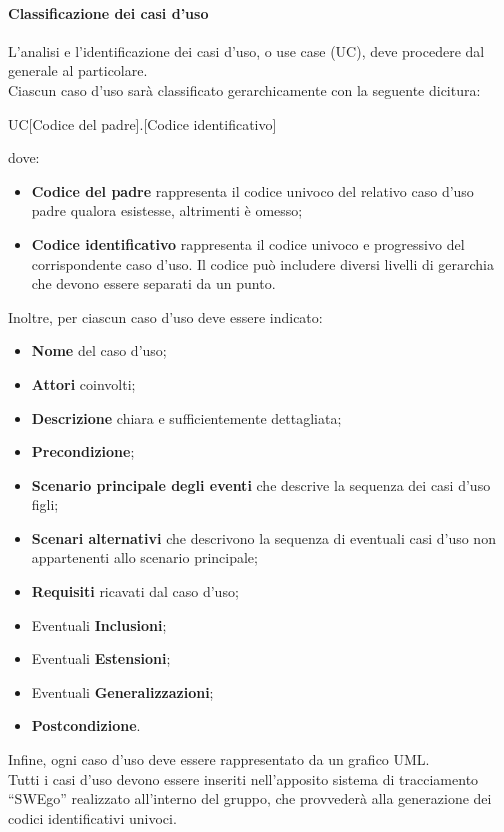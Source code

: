 \documentclass[../NormeDiProgetto.tex]{subfiles}
\begin{document}
			\paragraph{Classificazione dei casi d'uso\\}
				L'analisi e l'identificazione dei casi d'uso, o use case (UC), deve
				procedere dal generale al particolare.\\
				Ciascun caso d'uso sarà classificato gerarchicamente con la seguente dicitura:
				\begin{center}
					UC[Codice del padre].[Codice identificativo]
				\end{center}
				dove:
				\begin{itemize}
					\item \textbf{Codice del padre} rappresenta il codice univoco
					del relativo caso d'uso padre qualora esistesse, altrimenti è omesso;
					\item \textbf{Codice identificativo} rappresenta il codice
					univoco e progressivo del corrispondente caso d'uso. Il codice
					può includere diversi livelli di gerarchia che devono essere
					separati da un punto.
				\end{itemize}
				Inoltre, per ciascun caso d'uso deve essere indicato:
				\begin{itemize}
					\item \textbf{Nome} del caso d'uso;
					\item \textbf{Attori} coinvolti;
					\item \textbf{Descrizione} chiara e sufficientemente
					dettagliata;
					\item \textbf{Precondizione};
					\item \textbf{Scenario principale degli eventi} che descrive
					la sequenza dei casi d'uso figli;
					\item \textbf{Scenari alternativi} che descrivono la sequenza
					di eventuali casi d'uso non appartenenti allo scenario
					principale;
					\item \textbf{Requisiti} ricavati dal caso d'uso;
					\item Eventuali \textbf{Inclusioni};
					\item Eventuali \textbf{Estensioni};
					\item Eventuali \textbf{Generalizzazioni};
					\item \textbf{Postcondizione}.
				\end{itemize}
				Infine, ogni caso d'uso deve essere rappresentato da un grafico UML.\\
				Tutti i casi d'uso devono essere inseriti nell'apposito sistema di tracciamento ``SWEgo''
				realizzato all'interno del gruppo, che provvederà alla generazione
				dei codici identificativi univoci.
\end{document}

